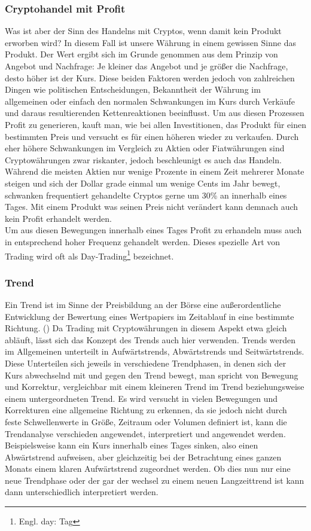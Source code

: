 \documentclass[12pt]{article}
\begin{document}
	\subsubsection{Cryptohandel mit Profit}
		Was ist aber der Sinn des Handelns mit Cryptos, wenn damit kein Produkt erworben wird? In diesem Fall ist unsere Währung in einem gewissen Sinne das Produkt. Der Wert ergibt sich im Grunde genommen aus dem Prinzip von Angebot und Nachfrage: Je kleiner das Angebot und je größer die Nachfrage, desto höher ist der Kurs. Diese beiden Faktoren werden jedoch von zahlreichen Dingen wie politischen Entscheidungen, Bekanntheit der Währung im allgemeinen oder einfach den normalen Schwankungen im Kurs durch Verkäufe und daraus resultierenden Kettenreaktionen beeinflusst. Um aus diesen Prozessen Profit zu generieren, kauft man, wie bei allen Investitionen, das Produkt für einen bestimmten Preis und versucht es für einen höheren wieder zu verkaufen. Durch eher höhere Schwankungen im Vergleich zu Aktien oder Fiatwährungen sind Cryptowährungen zwar riskanter, jedoch beschleunigt es auch das Handeln. Während die meisten Aktien nur wenige Prozente in einem Zeit mehrerer Monate steigen und sich der Dollar grade einmal um wenige Cents im Jahr bewegt, schwanken frequentiert gehandelte Cryptos gerne um 30\% an innerhalb eines Tages. Mit einem Produkt was seinen Preis nicht verändert kann demnach auch kein Profit erhandelt werden.\\
		Um aus diesen Bewegungen innerhalb eines Tages Profit zu erhandeln muss auch in entsprechend hoher Frequenz gehandelt werden. Dieses spezielle Art von Trading wird oft als Day-Trading\footnote{Engl. day: Tag} bezeichnet.	
	\subsubsection{Trend}
		\glqq Ein Trend ist im Sinne der Preisbildung an der Börse eine außerordentliche Entwicklung der Bewertung eines Wertpapiers im Zeitablauf in eine bestimmte Richtung\grqq{}. (\cite{WhatIsATrend}) Da Trading mit Cryptowährungen in diesem Aspekt etwa gleich abläuft, lässt sich das Konzept des Trends auch hier verwenden. Trends werden im Allgemeinen unterteilt in Aufwärtstrends, Abwärtstrends und Seitwärtstrends. Diese Unterteilen sich jeweils in verschiedene Trendphasen, in denen sich der Kurs abwechselnd mit und gegen den Trend bewegt, man spricht von Bewegung und Korrektur, vergleichbar mit einem kleineren Trend im Trend beziehungsweise einem untergeordneten Trend. Es wird versucht in vielen Bewegungen und Korrekturen eine allgemeine Richtung zu erkennen, da sie jedoch nicht durch feste Schwellenwerte in Größe, Zeitraum oder Volumen definiert ist, kann die Trendanalyse verschieden angewendet, interpretiert und angewendet werden. Beispielsweise kann ein Kurs innerhalb eines Tages sinken, also einen Abwärtstrend aufweisen, aber gleichzeitig bei der Betrachtung eines ganzen Monats einem klaren Aufwärtstrend zugeordnet werden. Ob dies nun nur eine neue Trendphase oder der gar der wechsel zu einem neuen Langzeittrend ist kann dann unterschiedlich interpretiert werden.
\end{document}
